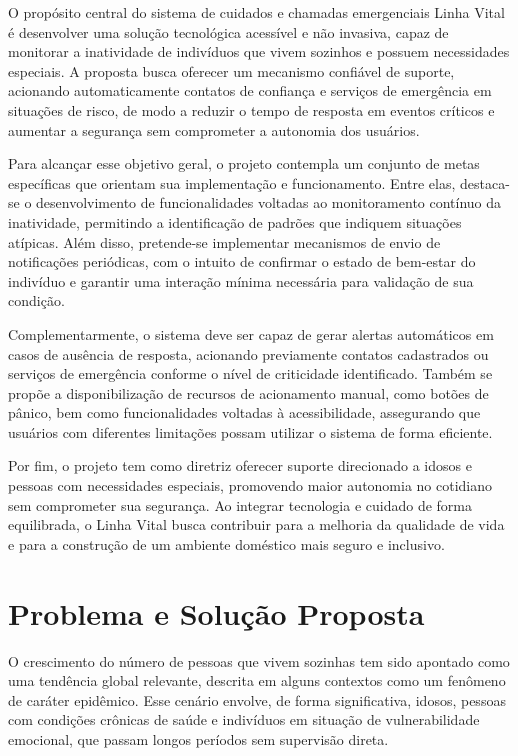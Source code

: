 O propósito central do sistema de cuidados e chamadas emergenciais Linha Vital é desenvolver uma solução tecnológica acessível e não invasiva, capaz de monitorar a inatividade de indivíduos que vivem sozinhos e possuem necessidades especiais. A proposta busca oferecer um mecanismo confiável de suporte, acionando automaticamente contatos de confiança e serviços de emergência em situações de risco, de modo a reduzir o tempo de resposta em eventos críticos e aumentar a segurança sem comprometer a autonomia dos usuários.

Para alcançar esse objetivo geral, o projeto contempla um conjunto de metas específicas que orientam sua implementação e funcionamento. Entre elas, destaca-se o desenvolvimento de funcionalidades voltadas ao monitoramento contínuo da inatividade, permitindo a identificação de padrões que indiquem situações atípicas. Além disso, pretende-se implementar mecanismos de envio de notificações periódicas, com o intuito de confirmar o estado de bem-estar do indivíduo e garantir uma interação mínima necessária para validação de sua condição.

Complementarmente, o sistema deve ser capaz de gerar alertas automáticos em casos de ausência de resposta, acionando previamente contatos cadastrados ou serviços de emergência conforme o nível de criticidade identificado. Também se propõe a disponibilização de recursos de acionamento manual, como botões de pânico, bem como funcionalidades voltadas à acessibilidade, assegurando que usuários com diferentes limitações possam utilizar o sistema de forma eficiente.

Por fim, o projeto tem como diretriz oferecer suporte direcionado a idosos e pessoas com necessidades especiais, promovendo maior autonomia no cotidiano sem comprometer sua segurança. Ao integrar tecnologia e cuidado de forma equilibrada, o Linha Vital busca contribuir para a melhoria da qualidade de vida e para a construção de um ambiente doméstico mais seguro e inclusivo.

\section{Problema e Solução Proposta}

O crescimento do número de pessoas que vivem sozinhas tem sido apontado como uma tendência global relevante, descrita em alguns contextos como um fenômeno de caráter epidêmico. Esse cenário envolve, de forma significativa, idosos, pessoas com condições crônicas de saúde e indivíduos em situação de vulnerabilidade emocional, que passam longos períodos sem supervisão direta.

